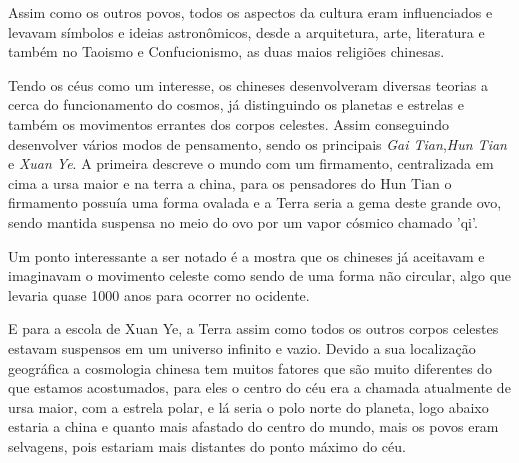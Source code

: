 Assim como os outros povos, todos os aspectos da cultura eram influenciados e levavam símbolos e ideias astronômicos, desde a arquitetura, arte, literatura e também no Taoismo e Confucionismo, as duas maios religiões chinesas.

Tendo os céus como um interesse, os chineses desenvolveram diversas teorias a cerca do funcionamento do cosmos, já distinguindo os planetas e estrelas e também os movimentos errantes dos corpos celestes. Assim conseguindo desenvolver vários modos de pensamento, sendo os principais {\it Gai Tian},{\it Hun Tian} e {\it Xuan Ye}. A primeira descreve o mundo com um firmamento, centralizada em cima a ursa maior e na terra a china, para os pensadores do Hun Tian o firmamento possuía uma forma ovalada e a Terra seria a gema deste grande ovo, sendo mantida suspensa no meio do ovo por um vapor cósmico chamado 'qi'.

Um ponto interessante a ser notado é a mostra que os chineses já aceitavam e imaginavam o movimento celeste como sendo de uma forma não circular, algo que levaria quase 1000 anos para ocorrer no ocidente.

E para a escola de Xuan Ye, a Terra assim como todos os outros corpos celestes estavam suspensos em um universo infinito e vazio. Devido a sua localização geográfica a cosmologia chinesa tem muitos fatores que são muito diferentes do que estamos acostumados, para eles o centro do céu era a chamada atualmente de ursa maior, com a estrela polar, e lá seria o polo norte do planeta, logo abaixo estaria a china e quanto mais afastado do centro do mundo, mais os povos eram selvagens, pois estariam mais distantes do ponto máximo do céu.


